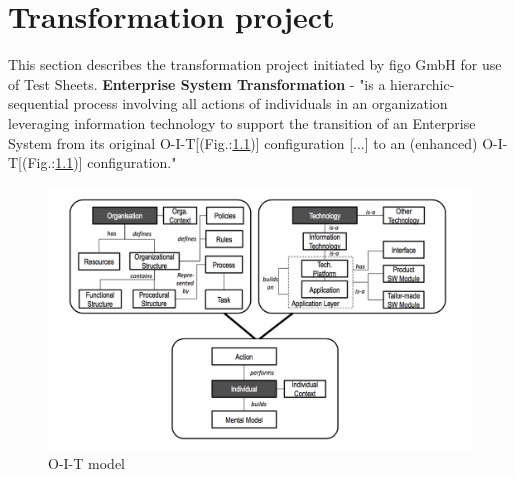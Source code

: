 


\chapter{Transformation project}
\label{sec:transP}
This section describes the transformation project initiated by figo GmbH for use of Test Sheets.
\textbf{Enterprise System Transformation} -  "is a hierarchic-sequential process involving all actions of individuals in an organization leveraging information technology to support the transition of an Enterprise System from its original O-I-T[(Fig.:\ref{fig:oit})] configuration [...] to an (enhanced) O-I-T[(Fig.:\ref{fig:oit})] configuration."\cite{MES5}

\begin{figure}[ht]
	\label{fig:oit}
	\centering
	\includegraphics[width=\textwidth]{grafiken/oit.png}
	\caption{O-I-T model\cite{MES5}}
\end{figure}

